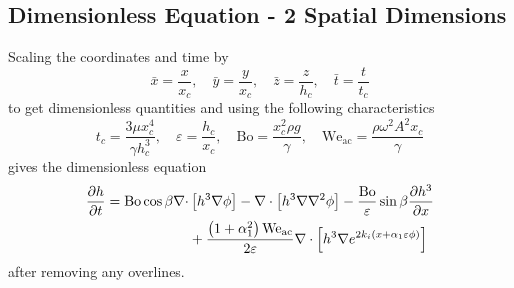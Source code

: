 \subsection{Dimensionless Equation - 2 Spatial Dimensions}
\begin{frame}
    Scaling the coordinates and time by 
    \begin{equation*}
        \bar{x} = \frac{x}{x_c}, \quad \bar{y} = \frac{y}{x_c}, \quad \bar{z} = \frac{z}{h_c}, \quad \bar{t} = \frac{t}{t_c}
    \end{equation*}
    to get dimensionless quantities and using the following characteristics
    \begin{equation*}
        t_c = \frac{3\mu x_c^4}{\gamma h_c^3}, \quad \varepsilon = \frac{h_c}{x_c}, \quad \mathrm{Bo} = \frac{x_c^2\rho g}{\gamma}, \quad \mathrm{We_{ac}} = \frac{\rho \omega^2 A^2x_c}{\gamma}
    \end{equation*}
    gives the dimensionless equation 
    \begin{equation}
        \begin{aligned}
            \frac{\partial h}{\partial t} = \mathrm{Bo} \cos\beta \nabla \cdot & \left[  h^3 \nabla \phi  \right] - 
            \nabla \cdot \left[ h^3 \nabla\nabla^2\phi  \right] - 
            \frac{\mathrm{Bo}}{\varepsilon} \sin\beta \frac{\partial h^3}{\partial x} \\
            &+\frac{\left( 1 + \alpha_1^2 \right) \mathrm{We_{ac}}}{2\varepsilon} \nabla \cdot \left[ h^3 \nabla e^{2k_i \left( x + \alpha_1 \varepsilon \phi \right)} \right] 
        \end{aligned} 
        \label{eq:nondim_final_twod}
    \end{equation}
    after removing any overlines.   
\end{frame}
